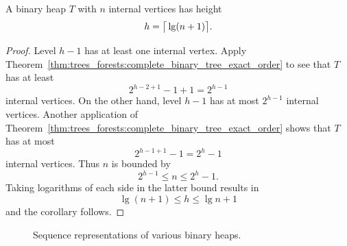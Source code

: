 \begin{corollary}
\label{cor:tree_data_structures:height_binary_heap}
A binary heap $T$ with $n$ internal vertices has height
\[
h
=
\big\lceil \lg(n + 1) \big\rceil.\index{$\lg$}
\]
\end{corollary}

\begin{proof}
Level $h - 1$ has at least one internal vertex. Apply
Theorem~\ref{thm:trees_forests:complete_binary_tree_exact_order} to
see that $T$ has at least
\[
2^{h - 2 + 1} - 1 + 1
=
2^{h - 1}
\]
internal vertices. On the other hand, level $h - 1$ has at most
$2^{h-1}$ internal vertices. Another application of
Theorem~\ref{thm:trees_forests:complete_binary_tree_exact_order} shows
that $T$ has at most
\[
2^{h - 1 + 1} - 1
=
2^h - 1
\]
internal vertices. Thus $n$ is bounded by
\[
2^{h - 1} \leq n \leq 2^h - 1.
\]
Taking logarithms of each side in the latter bound results in
\[
\lg(n + 1) \leq h \leq \lg n + 1
\]
and the corollary follows.
\end{proof}

\begin{figure}[!htbp]
\centering
{}
\qquad
{}
\caption{Sequence representations of various binary heaps.}
\label{fig:tree_data_structures:sequence_representations_binary_heaps}
\end{figure}


